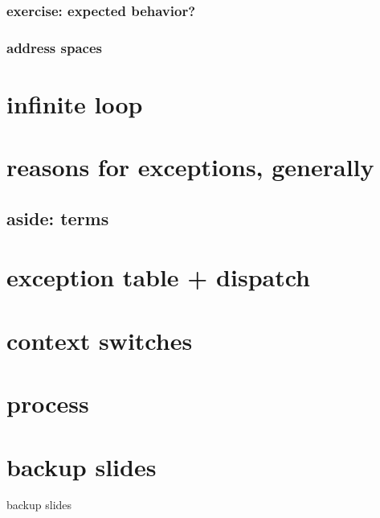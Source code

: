 \subsubsection{exercise: expected behavior?}


\subsubsection{address spaces}


\section{infinite loop}






\section{reasons for exceptions, generally}




\subsection{aside: terms}


\section{exception table + dispatch}



\section{context switches} %


\section{process}


\section{backup slides}
\begin{frame}{backup slides}
\end{frame}


